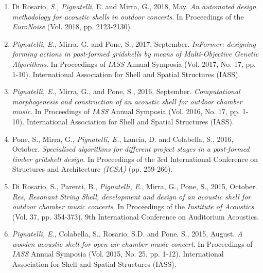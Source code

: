 \begin{publications}
\begin{enumerate}[leftmargin=0.45cm, itemsep=0em, topsep=0.5em, parsep=0.2em]
        \item Di Rosario, \emph{S., Pignatelli}, E. and Mirra, G., 2018, May. \textit{An automated design methodology for acoustic shells in outdoor concerts}. In Proceedings of the \emph{EuroNoise} (Vol. 2018, pp. 2123-2130).
        \item \emph{Pignatelli, E.}, Mirra, G. and Pone, S., 2017, September. \textit{InFormer: designing forming actions in post-formed gridshells by means of Multi-Objective Genetic Algorithms}. In Proceedings of \emph{IASS} Annual Symposia (Vol. 2017, No. 17, pp. 1-10). International Association for Shell and Spatial Structures (IASS).
        \item \emph{Pignatelli, E.}, Mirra, G., and Pone, S., 2016, September. \textit{Computational morphogenesis and construction of an acoustic shell for outdoor chamber music}. In Proceedings of \emph{IASS} Annual Symposia (Vol. 2016, No. 17, pp. 1-10). International Association for Shell and Spatial Structures (IASS).
        \item Pone, S., Mirra, G., \emph{Pignatelli, E.}, Lancia, D. and Colabella, S., 2016, October. \textit{Specialised algorithms for different project stages in a post-formed timber gridshell design}. In Proceedings of the 3rd International Conference on Structures and Architecture \emph{(ICSA)} (pp. 259-266).
        \item Di Rosario, S., Parenti, B., \emph{Pignatelli, E.}, Mirra, G., Pone, S., 2015, October. \textit{Res, Resonant String Shell, development and design of an acoustic shell for outdoor chamber music concerts}. In Proceedings of the \emph{Institute of Acoustics} (Vol. 37, pp. 354-373). 9th International Conference on Auditorium Acoustics.
        \item \emph{Pignatelli, E.}, Colabella, S., Rosario, S.D. and Pone, S., 2015, August. \textit{A wooden acoustic shell for open-air chamber music concert}. In Proceedings of \emph{IASS} Annual Symposia (Vol. 2015, No. 25, pp. 1-12). International Association for Shell and Spatial Structures (IASS).
    \end{enumerate}
\end{publications}
